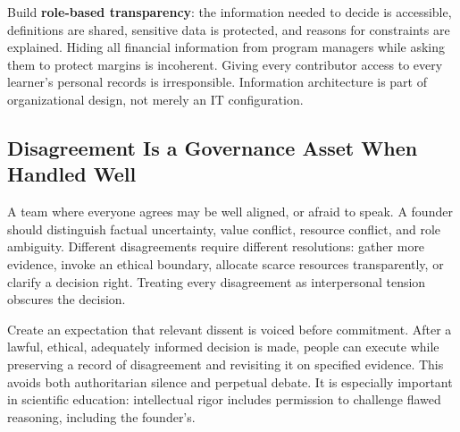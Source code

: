 Build \textbf{role-based transparency}: the information needed to decide is accessible, definitions are shared, sensitive data is protected, and reasons for constraints are explained. Hiding all financial information from program managers while asking them to protect margins is incoherent. Giving every contributor access to every learner's personal records is irresponsible. Information architecture is part of organizational design, not merely an IT configuration.

\subsection{Disagreement Is a Governance Asset When Handled Well}
\label{sec:disagreement_governance_asset}

A team where everyone agrees may be well aligned, or afraid to speak. A founder should distinguish factual uncertainty, value conflict, resource conflict, and role ambiguity. Different disagreements require different resolutions: gather more evidence, invoke an ethical boundary, allocate scarce resources transparently, or clarify a decision right. Treating every disagreement as interpersonal tension obscures the decision.

Create an expectation that relevant dissent is voiced before commitment. After a lawful, ethical, adequately informed decision is made, people can execute while preserving a record of disagreement and revisiting it on specified evidence. This avoids both authoritarian silence and perpetual debate. It is especially important in scientific education: intellectual rigor includes permission to challenge flawed reasoning, including the founder's.
